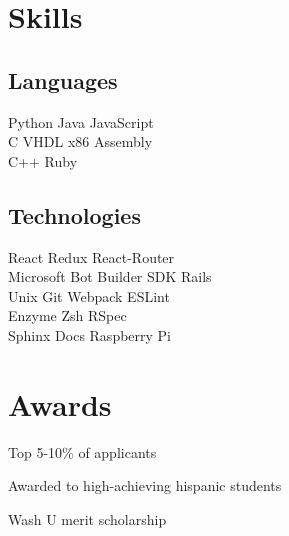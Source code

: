 \documentclass[]{deedy-resume-openfont}
\begin{document}
\begin{minipage}[t]{0.33\textwidth}

\section{Skills}
\subsection{Languages}
Python \textbullet{} Java \textbullet{} JavaScript \\
C \textbullet{} VHDL \textbullet{} x86 Assembly \\
C++ \textbullet{} Ruby \\
\sectionsep

\subsection{Technologies}
React \textbullet{} Redux \textbullet{} React-Router \\
Microsoft Bot Builder SDK \textbullet{} Rails \\
Unix \textbullet{} Git \textbullet{} Webpack \textbullet{} ESLint \\
Enzyme \textbullet{} Zsh \textbullet{} RSpec \\
Sphinx Docs \textbullet{} Raspberry Pi
\sectionsep


\section{Awards}
\vspace{\topsep} %
\begin{tightemize}
\item Top 5-10\% of applicants
\end{tightemize}

\begin{tightemize}
\item Awarded to high-achieving hispanic students
\end{tightemize}

\begin{tightemize}
\item Wash U merit scholarship
\end{tightemize}

\sectionsep

%
%

\end{minipage}
\end{document}
